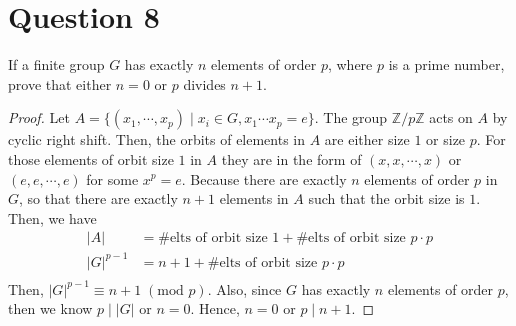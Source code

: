 \section{Question 8}

\begin{question}
    If a finite group $G$ has exactly $n$ elements of order $p$, where $p$ is a prime number, prove that either $n=0$ or $p$ divides $n+1$.
\end{question}

\begin{answer}
    \begin{proof}
        Let $A = \{(x_1,\cdots,x_p) \mid x_i \in G, x_1\cdots x_p = e\}$. The group $\mathbb{Z}/p\mathbb{Z}$ acts on $A$ by cyclic right shift. Then, the orbits of elements in $A$ are either size $1$ or size $p$. For those elements of orbit size $1$ in $A$ they are in the form of $(x,x,\cdots,x)$ or $(e,e,\cdots,e)$ for some $x^p = e$. Because there are exactly $n$ elements of order $p$ in $G$, so that there are exactly $n+1$ elements in $A$ such that the orbit size is $1$. Then, we have
        \begin{equation}
            \begin{aligned}
                \lvert A \rvert &= \#\text{elts of orbit size }1 + \#\text{elts of orbit size }p \cdot p\\
                \lvert G \rvert^{p-1} &= n+1 + \#\text{elts of orbit size }p \cdot p\\
            \end{aligned}
        \end{equation}
        Then, $\lvert G \rvert^{p-1} \equiv n+1 \;(\text{mod }p)$. Also, since $G$ has exactly $n$ elements of order $p$, then we know $p\mid \lvert G \rvert$ or $n = 0$. Hence, $n = 0$ or $p \mid n+1$.
    \end{proof}
\end{answer}